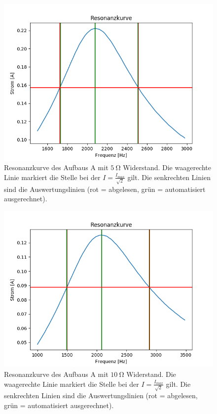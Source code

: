 \documentclass[12pt,a4paper]{article}
\begin{document}
\begin{figure}
	\centering
	\includegraphics[scale=0.8]{Bilder/Serie_Resonanzkurve_A_5.png}
	\caption{Resonanzkurve des Aufbaus A mit $\SI{5}{\ohm}$ Widerstand. Die waagerechte Linie markiert die Stelle bei der $I = \frac{I_{max}}{\sqrt{2}}$ gilt. Die senkrechten Linien sind die Auswertungslinien (rot = abgelesen, grün = automatisiert ausgerechnet).}
	\label{fig:Serie_Resonanzkurve_A_5}
\end{figure}
\begin{figure}
	\centering
	\includegraphics[scale=0.8]{Bilder/Serie_Resonanzkurve_A_10.png}
	\caption{Resonanzkurve des Aufbaus A mit $\SI{10}{\ohm}$ Widerstand. Die waagerechte Linie markiert die Stelle bei der $I = \frac{I_{max}}{\sqrt{2}}$ gilt. Die senkrechten Linien sind die Auswertungslinien (rot = abgelesen, grün = automatisiert ausgerechnet).}
	\label{fig:Serie_Resonanzkurve_A_10}
\end{figure}
\end{document}
